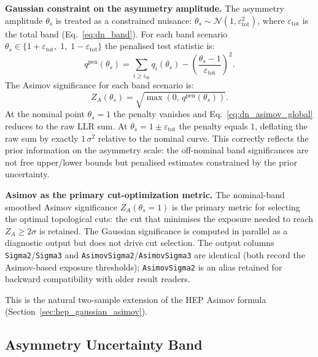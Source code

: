 \documentclass[12pt,a4paper]{article}
\newcommand{\ZA}{Z_A}
\newcommand{\epstot}{\varepsilon_{\mathrm{tot}}} %
\begin{document}
\medskip
\noindent\textbf{Gaussian constraint on the asymmetry amplitude.}
The asymmetry amplitude $\theta_s$ is treated as a constrained nuisance:
$\theta_s \sim \mathcal{N}(1, \epstot^2)$, where $\epstot$ is the total
band (Eq.~\eqref{eq:dn_band}).
For each band scenario $\theta_s \in \{1+\epstot,\;1,\;1-\epstot\}$ the
penalised test statistic is:
\begin{equation}
  q^{\mathrm{pen}}(\theta_s)
  = \sum_{i \ge i_{\mathrm{th}}} q_i(\theta_s)
    - \left(\frac{\theta_s - 1}{\epstot}\right)^{\!2}.
  \label{eq:dn_asimov_penalised}
\end{equation}
The Asimov significance for each band scenario is:
\begin{equation}
  \ZA(\theta_s) = \sqrt{\max\!\left(0,\,q^{\mathrm{pen}}(\theta_s)\right)}.
  \label{eq:dn_asimov_global}
\end{equation}
At the nominal point $\theta_s=1$ the penalty vanishes and
Eq.~\eqref{eq:dn_asimov_global} reduces to the raw LLR sum.
At $\theta_s = 1\pm\epstot$ the penalty equals $1$, deflating the raw
sum by exactly $1\,\sigma^2$ relative to the nominal curve.
This correctly reflects the prior information on the asymmetry scale: the
off-nominal band significances are not free upper/lower bounds but
penalised estimates constrained by the prior uncertainty.

\medskip
\noindent\textbf{Asimov as the primary cut-optimization metric.}
The nominal-band smoothed Asimov significance $\ZA(\theta_s{=}1)$ is the
primary metric for selecting the optimal topological cuts: the cut that
minimises the exposure needed to reach $\ZA \ge 2\sigma$ is retained.
The Gaussian significance is computed in parallel as a diagnostic output
but does not drive cut selection.
The output columns \texttt{Sigma2}/\texttt{Sigma3} and
\texttt{AsimovSigma2}/\texttt{AsimovSigma3} are identical (both record
the Asimov-based exposure thresholds); \texttt{AsimovSigma2} is an alias
retained for backward compatibility with older result readers.

This is the natural two-sample extension of the HEP Asimov formula
(Section~\ref{sec:hep_gaussian_asimov}).

\subsection{Asymmetry Uncertainty Band}
\label{sec:dn_band}
\end{document}
